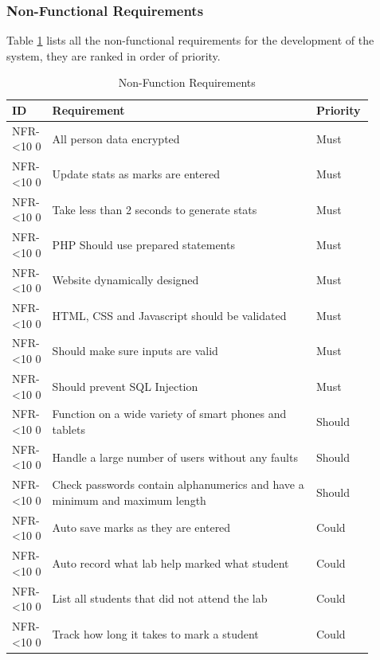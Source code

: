 \documentclass[12pt]{article}  %
\newcommand{\rid}[1]{\centering #1-\ifnum\value{requirement}<10 0\fi\arabic{requirement} \stepcounter{requirement}}
\begin{document}
\newpage
\subsubsection{Non-Functional Requirements} \label{sec:non-func}

Table \ref{table:non-func} lists all the non-functional requirements for the development of the system, they are ranked in order of priority.

\begin{spacing}{1.5}
\begin{longtable}{|p{0.1\linewidth}|p{0.7\linewidth}|p{0.1\linewidth}|}
\caption{Non-Function Requirements} \label{table:non-func}\\
\hline
\textbf{ID} & \textbf{Requirement} & \textbf{Priority}\\
\hline \hline


\rid{NFR} & All person data encrypted & Must\\ \hline
\rid{NFR} & Update stats as marks are entered & Must\\ \hline
\rid{NFR} & Take less than 2 seconds to generate stats  & Must\\ \hline
\rid{NFR} & PHP Should use prepared statements & Must\\ \hline
\rid{NFR} & Website dynamically designed & Must\\ \hline
\rid{NFR} & HTML, CSS and Javascript should be validated & Must\\ \hline
\rid{NFR} & Should make sure inputs are valid & Must\\ \hline
\rid{NFR} & Should prevent SQL Injection & Must\\ \hline


\rid{NFR} & Function on a wide variety of smart phones and tablets & Should\\ \hline
\rid{NFR} & Handle a large number of users without any faults & Should\\ \hline
\rid{NFR} & Check passwords contain alphanumerics and have a minimum and maximum length  & Should\\ \hline
\rid{NFR} & Auto save marks as they are entered & Could\\ \hline
\rid{NFR} & Auto record what lab help marked what student & Could\\ \hline
\rid{NFR} & List all students that did not attend the lab & Could\\ \hline
\rid{NFR} & Track how long it takes to mark a student & Could \\ \hline



\end{longtable}
\end{spacing}
\end{document}

